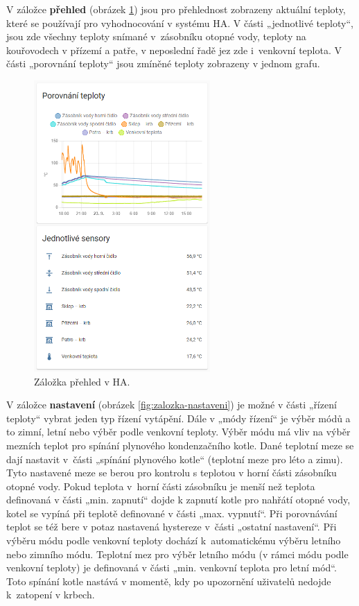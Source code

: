 V záložce \textbf{přehled} (obrázek \ref{fig:zalozka-prehled}) jsou pro přehlednost zobrazeny aktuální teploty, které se používají pro vyhodnocování v systému HA. V části „jednotlivé teploty“, jsou zde všechny teploty snímané v~zásobníku otopné vody, teploty na kouřovodech v přízemí a patře, v neposlední řadě jez zde i~venkovní teplota. V části „porovnání teploty“ jsou zmíněné teploty zobrazeny v jednom grafu.

\begin{figure}[H]
    \centering
    \includegraphics[width=0.6\textwidth]{images/software-ha/zalozka-prehled.png}
    \caption{Záložka přehled v HA.}
    \label{fig:zalozka-prehled}
\end{figure}

V záložce \textbf{nastavení} (obrázek \ref{fig:zalozka-nastaveni}) je možné v části „řízení teploty“ vybrat jeden typ řízení vytápění. Dále v „módy řízení“ je výběr módů a to zimní, letní nebo výběr podle venkovní teploty. Výběr módu má vliv na výběr mezních teplot pro spínání plynového kondenzačního kotle. Dané teplotní meze se dají nastavit v~části „spínání plynového kotle“ (teplotní meze pro léto a zimu). Tyto nastavené meze se berou pro kontrolu s teplotou v horní části zásobníku otopné vody. Pokud teplota v~horní části zásobníku je menší než teplota definovaná v části „min. zapnutí“ dojde k zapnutí kotle pro nahřátí otopné vody, kotel se vypíná při teplotě definované v části „max. vypnutí“. Při porovnávání teplot se též bere v potaz nastavená hystereze v~části „ostatní nastavení“. Při výběru módu podle venkovní teploty dochází k~automatickému výběru letního nebo zimního módu. Teplotní mez pro výběr letního módu (v rámci módu podle venkovní teploty) je definovaná v části „min. venkovní teplota pro letní mód“. Toto spínání kotle nastává v momentě, kdy po upozornění uživatelů nedojde k~zatopení v krbech.


